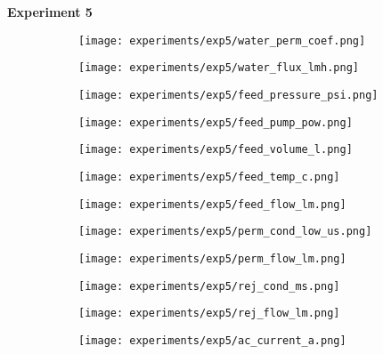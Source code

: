 \documentclass{article}
\begin{document}
    \pagebreak
    
    \textbf{Experiment 5}
    \begin{figure}[H]
        \centering
        \begin{subfigure}{0.48\linewidth}
		    \texttt{[image: experiments/exp5/water\_perm\_coef.png]}
	    \end{subfigure}
	    \begin{subfigure}{0.48\linewidth}
		    \texttt{[image: experiments/exp5/water\_flux\_lmh.png]}
	    \end{subfigure}
	    \begin{subfigure}{0.48\linewidth}
		    \texttt{[image: experiments/exp5/feed\_pressure\_psi.png]}
	    \end{subfigure}
	    \begin{subfigure}{0.48\linewidth}
		    \texttt{[image: experiments/exp5/feed\_pump\_pow.png]}
	    \end{subfigure}
	    \begin{subfigure}{0.48\linewidth}
		    \texttt{[image: experiments/exp5/feed\_volume\_l.png]}
	    \end{subfigure}
	    \begin{subfigure}{0.48\linewidth}
		    \texttt{[image: experiments/exp5/feed\_temp\_c.png]}
	    \end{subfigure}
	    \begin{subfigure}{0.48\linewidth}
		    \texttt{[image: experiments/exp5/feed\_flow\_lm.png]}
	    \end{subfigure}
	    \begin{subfigure}{0.48\linewidth}
		    \texttt{[image: experiments/exp5/perm\_cond\_low\_us.png]}
	    \end{subfigure}
	    \begin{subfigure}{0.48\linewidth}
		    \texttt{[image: experiments/exp5/perm\_flow\_lm.png]}
	    \end{subfigure}
	    \begin{subfigure}{0.48\linewidth}
		    \texttt{[image: experiments/exp5/rej\_cond\_ms.png]}
	    \end{subfigure}
	    \begin{subfigure}{0.48\linewidth}
		    \texttt{[image: experiments/exp5/rej\_flow\_lm.png]}
	    \end{subfigure}
	    \begin{subfigure}{0.48\linewidth}
		    \texttt{[image: experiments/exp5/ac\_current\_a.png]}
	    \end{subfigure}
    \end{figure}
    
\end{document}
